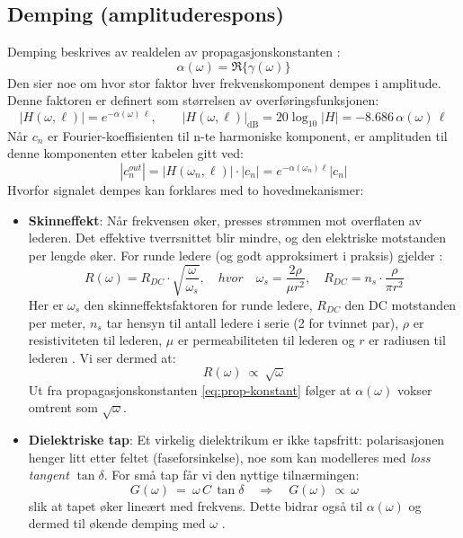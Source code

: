 \clearpage
\subsection{Demping (amplituderespons)}
Demping beskrives av realdelen av propagasjonskonstanten \cite{HaytBuck2018}:
\[ 
  \alpha(\omega)=\Re\{\gamma(\omega)\}
\]
Den sier noe om hvor stor faktor hver frekvenskomponent dempes i amplitude. Denne faktoren er definert som størrelsen av overføringsfunksjonen:
\[
|H(\omega,\ell)|=e^{-\alpha(\omega)\,\ell}, \qquad |H(\omega,\ell)|_{\mathrm{dB}} = 20\log_{10}|H| = -8.686\,\alpha(\omega)\,\ell
\]
Når $c_n$ er Fourier-koeffisienten til n-te harmoniske komponent, er amplituden til denne komponenten etter kabelen gitt ved:
\[
|c_n^{out}| = |H(\omega_n,\ell)| \cdot |c _n| = e^{-\alpha(\omega_n) \ell} |c_n|
\]
Hvorfor signalet dempes kan forklares med to hovedmekanismer:\\
\begin{itemize}[leftmargin=2.8em,style=nextline]
  \item \textbf{Skinneffekt}: Når frekvensen øker, presses strømmen mot overflaten av lederen. Det effektive tverrsnittet blir mindre, og den elektriske motstanden per lengde øker. For runde ledere (og godt approksimert i praksis) gjelder :
    \begin{equation}
        R(\omega) = R_{DC} \cdot \sqrt{\frac{\omega}{\omega_{s}}}, \quad hvor \quad \omega_{s} = \frac{2 \rho}{ \mu r^2}, \quad R_{DC} = n_s \cdot \frac{\rho}{\pi r^2}
        \label{eq:skin-effekt}
    \end{equation}
    Her er $\omega_{s}$ den skinneffektsfaktoren for runde ledere, $R_{DC}$ den DC motstanden per meter, $n_s$ tar hensyn til antall ledere i serie (2 for tvinnet par), $\rho$ er resistiviteten til lederen, $\mu$ er permeabiliteten til lederen og $r$ er radiusen til lederen \cite{PalermoLecture2023}. Vi ser dermed at:
    \[
    R(\omega)\ \propto\ \sqrt{\omega}
    \]
  Ut fra propagasjonskonstanten \eqref{eq:prop-konstant} følger at $\alpha(\omega)$ vokser omtrent som $\sqrt{\omega}$.\\
  \item \textbf{Dielektriske tap}: Et virkelig dielektrikum er ikke tapsfritt: polarisasjonen henger litt etter feltet (faseforsinkelse), noe som kan modelleres med \emph{loss tangent} \(\tan\delta\). For små tap får vi den nyttige tilnærmingen:
  \begin{equation}
  G(\omega)\ =\ \omega\,C\,\tan\delta \quad \Rightarrow \quad G(\omega)\ \propto\ \omega
    \label{eq:dielectric_loss}
  \end{equation}
  slik at tapet øker lineært med frekvens. Dette bidrar også til \(\alpha(\omega)\) og dermed til økende demping med \(\omega\) \cite{PalermoLecture2023}.\\
\end{itemize}
\clearpage

